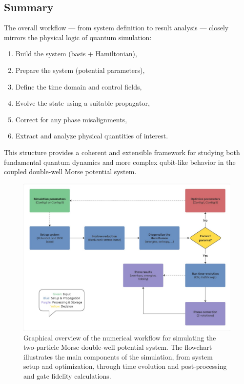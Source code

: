 \documentclass{subfiles}
\begin{document}
\subsection*{Summary}

The overall workflow — from system definition to result analysis — closely mirrors the physical logic of quantum simulation:
\begin{enumerate}
    \item Build the system (basis + Hamiltonian),
    \item Prepare the system (potential parameters),
    \item Define the time domain and control fields,
    \item Evolve the state using a suitable propagator,
    \item Correct for any phase misalignments,
    \item Extract and analyze physical quantities of interest.
\end{enumerate}

This structure provides a coherent and extensible framework for studying both fundamental quantum dynamics and more complex qubit-like behavior in the coupled double-well Morse potential system.

\begin{figure}[h!]
    \centering
    \includegraphics[width=1.0\textwidth]{figs/Flowchart.pdf}
    \caption{Graphical overview of the numerical workflow for simulating the two-particle Morse double-well potential system. The flowchart illustrates the main components of the simulation, from system setup and optimization, through time evolution and post-processing and gate fidelity calculations. }
\end{figure}
\end{document}
